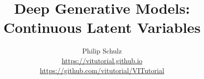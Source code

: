 \documentclass[14pt, aspectratio=169]{beamer}
\title{Deep Generative Models: \\
Continuous Latent Variables}
\author{Philip Schulz\\
\url{https://vitutorial.github.io} \\
\url{https://github.com/vitutorial/VITutorial}}
\date{}
\begin{document}
\begin{frame}
\maketitle
\end{frame}

\frame{\tableofcontents}

%
%
%
%
%
%
%
%
%
%
%
%
\end{document}
